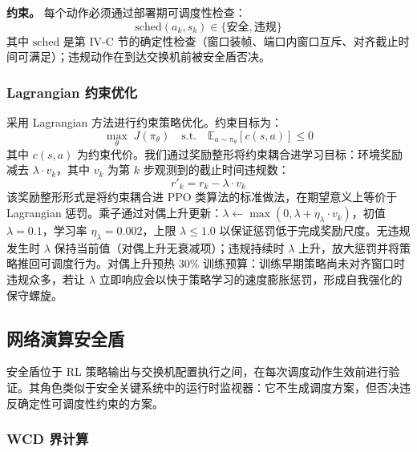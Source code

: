 \documentclass[UTF8]{ctexart}
\begin{document}
\textbf{约束。} 每个动作必须通过部署期可调度性检查：
\begin{equation}
\text{sched}(a_k, s_k) \in \{\text{安全}, \text{违规}\}
\end{equation}
其中 $\text{sched}$ 是第 IV-C 节的确定性检查（窗口装帧、端口内窗口互斥、对齐截止时间可满足）；违规动作在到达交换机前被安全盾否决。

\subsubsection{Lagrangian 约束优化}

采用 Lagrangian 方法进行约束策略优化。约束目标为：
\begin{equation}
\max_{\theta} \; J(\pi_\theta) \quad \text{s.t.} \quad \mathbb{E}_{a \sim \pi_\theta}[c(s,a)] \leq 0
\end{equation}
其中 $c(s,a)$ 为约束代价。我们通过奖励整形将约束耦合进学习目标：环境奖励减去 $\lambda \cdot v_k$，其中 $v_k$ 为第 $k$ 步观测到的截止时间违规数：
\begin{equation}
r'_k = r_k - \lambda \cdot v_k
\end{equation}
该奖励整形形式是将约束耦合进 PPO 类算法的标准做法，在期望意义上等价于 Lagrangian 惩罚。乘子通过对偶上升更新：$\lambda \leftarrow \max(0, \lambda + \eta_\lambda \cdot v_k)$，初值 $\lambda = 0.1$，学习率 $\eta_\lambda = 0.002$，上限 $\lambda \leq 1.0$ 以保证惩罚低于完成奖励尺度。无违规发生时 $\lambda$ 保持当前值（对偶上升无衰减项）；违规持续时 $\lambda$ 上升，放大惩罚并将策略推回可调度行为。对偶上升预热 30\% 训练预算：训练早期策略尚未对齐窗口时违规众多，若让 $\lambda$ 立即响应会以快于策略学习的速度膨胀惩罚，形成自我强化的保守螺旋。

\subsection{网络演算安全盾}

安全盾位于 RL 策略输出与交换机配置执行之间，在每次调度动作生效前进行验证。其角色类似于安全关键系统中的运行时监视器：它不生成调度方案，但否决违反确定性可调度性约束的方案。

\subsubsection{WCD 界计算}
\end{document}
